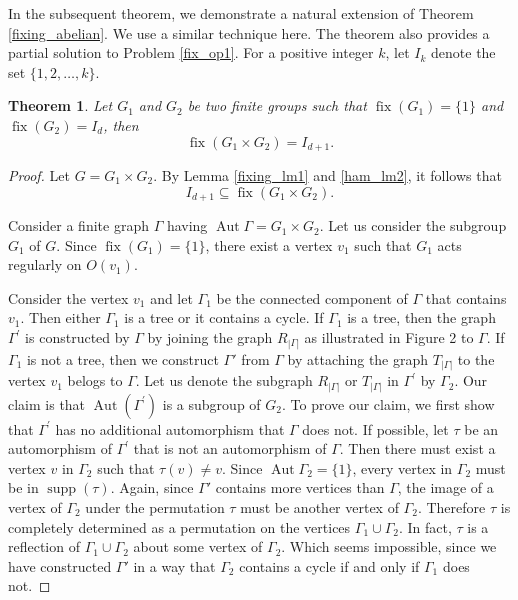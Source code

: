 \documentclass[12pt]{article}
\theoremstyle{plain}
\newtheorem{theorem}{Theorem}[section]
\theoremstyle{definition}
\newcommand{\Aut}{\mathop{\mathrm{Aut}}}
\newcommand{\fix}{\mathop{\mathrm{fix}}}
\newcommand{\supp}{\mathop{\mathrm{supp}}}
\begin{document}
	In the subsequent theorem, we demonstrate a natural extension of Theorem \ref{fixing_abelian}. We use a similar technique here. The theorem also provides a partial solution to Problem \ref{fix_op1}. For a positive integer $k$, let $I_k$ denote the set $\{1,2,\ldots, k\}$.
	\begin{theorem}
		Let $G_{1}$ and $G_2$ be two finite groups such that $\fix(G_{1})=\{1\}$ and $\fix(G_2)=I_d$, then $$\fix(G_1 \times G_2)=I_{d+1}.$$
	\end{theorem}	
	\begin{proof}
		Let $G= G_{1} \times G_{2}$. By Lemma \ref{fixing_lm1} and \ref{ham_lm2}, it follows that $$I_{d+1} \subseteq \fix(G_{1} \times G_{2}).$$
		
		Consider a finite graph $\Gamma$ having $\Aut \Gamma = G_{1} \times G_{2}$. Let us consider the subgroup $G_{1}$ of $G$. Since $\fix(G_{1}) = \{1\}$, there exist a vertex $v_{1}$ such that $G_{1}$ acts regularly on $O(v_{1})$.
		
		
		Consider the vertex $v_1$ and let $\Gamma_{1}$ be the connected component of $\Gamma$ that contains $v_{1}$. Then either $\Gamma_{1}$ is a tree or it contains a cycle. If $\Gamma_{1}$ is a tree, then the graph $\Gamma^{'}$ is constructed by $\Gamma$ by joining the graph $R_{|\Gamma|}$ as illustrated in Figure 2 to $\Gamma$. If $\Gamma_1$ is not a tree, then we construct $\Gamma'$ from $\Gamma$ by attaching the graph $T_{|\Gamma|}$ to the vertex $v_{1}$ belogs to $\Gamma$. Let us denote the subgraph $R_{|\Gamma|}$ or $T_{|\Gamma|}$ in $\Gamma^{'}$ by $\Gamma_{2}$. Our claim is that $\Aut(\Gamma^{'})$ is a subgroup of $G_{2}$. To prove our claim, we first show that $\Gamma^{'}$ has no additional automorphism that $\Gamma$ does not. If possible, let $\tau$ be an automorphism of $\Gamma^{'}$ that is not an automorphism of $\Gamma$. Then there must exist a vertex $v$ in $\Gamma_2$ such that $\tau(v)\neq v$. Since $\Aut \Gamma_2=\{1\}$, every vertex in $\Gamma_2$ must be in $\supp (\tau)$. Again, since $\Gamma'$ contains more vertices than $\Gamma$, the image of a vertex of $\Gamma_{2}$ under the permutation $\tau$ must be another vertex of $\Gamma_{2}$. Therefore $\tau$ is completely determined as a permutation on the vertices $\Gamma_{1} \cup \Gamma_{2}$. In fact, $\tau$ is a reflection of $\Gamma_{1} \cup \Gamma_{2}$ about some vertex of $\Gamma_{2}$. Which seems impossible, since we have constructed $\Gamma'$ in a way that $\Gamma_{2}$ contains a cycle if and only if $\Gamma_{1}$ does not.
		

\end{proof}
\end{document}
